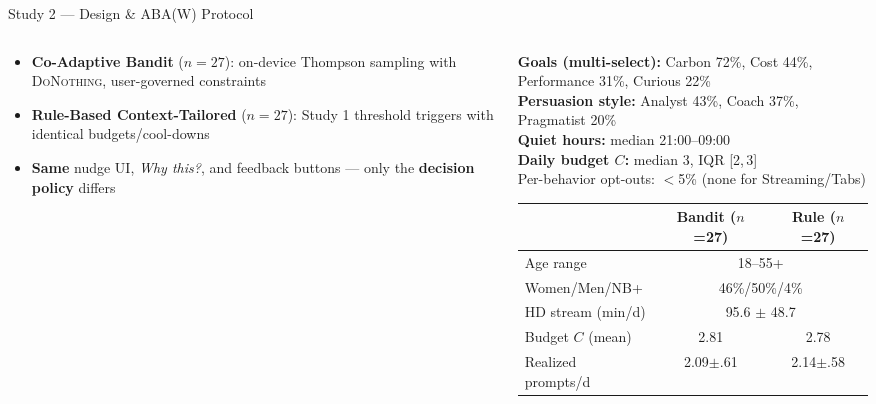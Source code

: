\documentclass[10pt,aspectratio=169]{beamer}
\newcommand{\emphmark}[1]{\textcolor{chiAccent}{\textbf{#1}}}
\begin{document}
\begin{frame}{Study 2 --- Design \& ABA(W) Protocol}
\vspace{-2pt}
\begin{columns}[T]
\begin{column}{0.52\textwidth}
\vspace{0pt}
\begin{keybox}
\scriptsize
\begin{itemize}[nosep, leftmargin=*]
  \item \textbf{Co-Adaptive Bandit} ($n{=}27$): on-device Thompson sampling with \textsc{DoNothing}, user-governed constraints
  \item \textbf{Rule-Based Context-Tailored} ($n{=}27$): Study 1 threshold triggers with identical budgets/cool-downs
  \item \textbf{Same} nudge UI, \emph{Why this?}, and feedback buttons --- only the \emphmark{decision policy} differs
\end{itemize}
\end{keybox}
\end{column}
\begin{column}{0.46\textwidth}
\vspace{0pt}
\begin{keybox}
\tiny
\textbf{Goals (multi-select):} Carbon 72\%, Cost 44\%, Performance 31\%, Curious 22\%\\[1pt]
\textbf{Persuasion style:} Analyst 43\%, Coach 37\%, Pragmatist 20\%\\[1pt]
\textbf{Quiet hours:} median 21:00--09:00\\[1pt]
\textbf{Daily budget $C$:} median 3, IQR [2,\,3]\\[1pt]
Per-behavior opt-outs: $<$5\% (none for Streaming/Tabs)
\end{keybox}
\vspace{2pt}
{\tiny
\renewcommand{\arraystretch}{0.88}
\begin{tabular}{@{}lcc@{}}
\toprule
& \textbf{Bandit} ($n$=27) & \textbf{Rule} ($n$=27) \\
\midrule
Age range & \multicolumn{2}{c}{18--55+}\\
Women/Men/NB+ & \multicolumn{2}{c}{46\%/50\%/4\%}\\
HD stream (min/d) & \multicolumn{2}{c}{95.6 $\pm$ 48.7}\\
Budget $C$ (mean) & 2.81 & 2.78 \\
Realized prompts/d & 2.09$\pm$.61 & 2.14$\pm$.58 \\

\end{tabular}}
\end{column}
\end{columns}
\end{frame}
\end{document}
